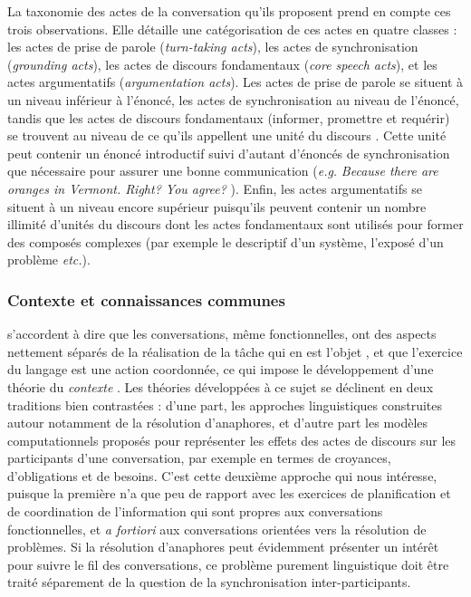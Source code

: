 \documentclass[10pt,a4paper,twoside]{article}
\begin{document}
La taxonomie des actes de la conversation qu'ils proposent prend en compte ces trois observations. Elle détaille une catégorisation de ces actes en quatre classes : les actes de prise de parole (\textit{turn-taking acts}), les actes de synchronisation (\textit{grounding acts}), les actes de discours fondamentaux (\textit{core speech acts}), et les actes argumentatifs (\textit{argumentation acts}). Les actes de prise de parole se situent à un niveau inférieur à l'énoncé, les actes de synchronisation au niveau de l'énoncé, tandis que les actes de discours fondamentaux (informer, promettre et requérir) se trouvent au niveau de ce qu'ils appellent une \og unité du discours \fg. Cette unité peut contenir un énoncé introductif suivi d'autant d'énoncés de synchronisation que nécessaire pour assurer une bonne communication (\textit{e.g.} \textit{\og Because there are oranges in Vermont. Right? You agree? \fg}). Enfin, les actes argumentatifs se situent à un niveau encore supérieur puisqu'ils peuvent contenir un nombre illimité d'unités du discours dont les actes fondamentaux sont utilisés pour former des composés complexes (par exemple le descriptif d'un système, l'exposé d'un problème \textit{etc.}).

\subsubsection{Contexte et connaissances communes}

\citeauthor{poesio1997conversational} s'accordent à dire que les conversations, même fonctionnelles, ont des aspects nettement séparés de la réalisation de la tâche qui en est l'objet \cite{poesio1998towards}, et que l'exercice du langage est une action coordonnée, ce qui impose le développement d'une théorie du \textit{contexte} \cite{poesio1997conversational}. Les théories développées à ce sujet se déclinent en deux traditions bien contrastées : d'une part, les approches linguistiques construites autour notamment de la résolution d'anaphores, et d'autre part les modèles computationnels proposés pour représenter les effets des actes de discours sur les participants d'une conversation, par exemple en termes de croyances, d'obligations et de besoins. C'est cette deuxième approche qui nous intéresse, puisque la première n'a que peu de rapport avec les exercices de planification et de coordination de l'information qui sont propres aux conversations fonctionnelles, et \textit{a fortiori} aux conversations orientées vers la résolution de problèmes. Si la résolution d'anaphores peut évidemment présenter un intérêt pour suivre le fil des conversations, ce problème purement linguistique doit être traité séparement de la question de la synchronisation inter-participants.
\end{document}
